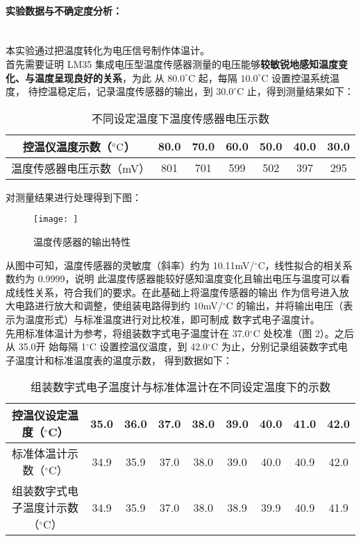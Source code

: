 \documentclass[UTF8]{ctexart}
\begin{document}
\title{}
\author{\songti{\large{}}}
\maketitle
{}
\paragraph*{实验数据与不确定度分析：}~\\
\indent 本实验通过把温度转化为电压信号制作体温计。~\\
\indent 首先需要证明 LM35 集成电压型温度传感器测量的电压能够\textbf{较敏锐地感知温度变化、与温度呈现良好的关系}，为此
从 $80.0^\circ$C 起，每隔 $10.0^\circ$C 设置控温系统温度，
待控温稳定后，记录温度传感器的输出，到 $30.0^\circ$C 止，得到测量结果如下：
\begin{table}[H]
    \centering
    \caption{不同设定温度下温度传感器电压示数}
    \begin{tabular}{ccccccc}
        \hline
     控温仪温度示数（$^{\circ}\rm{C}$）& 80.0  & 70.0  & 60.0   & 50.0  & 40.0 &30.0\\
    \hline
    温度传感器电压示数（mV） &801 &701 &599 &502 &397 &295\\
    \hline                  
    \end{tabular}
    \end{table}
对测量结果进行处理得到下图：
\begin{figure}[H]
    \centering
    \texttt{[image: ]}
    \caption{温度传感器的输出特性}
 \end{figure}
 从图中可知，温度传感器的灵敏度（斜率）约为 10.11mV/$^\circ$C，线性拟合的相关系数约为 0.9999，说明
 此温度传感器能较好感知温度变化且输出电压与温度可以看成线性关系，符合我们的要求。在此基础上将温度传感器的输出
 作为信号进入放大电路进行放大和调整，使组装电路得到约 10mV/$^\circ$C 的输出，并将输出电压（表示为温度形式）与标准温度进行对比校准，即可制成
 数字式电子温度计。~\\
 \indent 先用标准体温计为参考，将组装数字式电子温度计在 37.0$^\circ$C 处校准（图 2）。之后从 35.0开
 始每隔 1$^\circ$C 设置控温仪温度，到 42.0$^\circ$C 为止，分别记录组装数字式电子温度计和标准温度表的温度示数，
 得到数据如下：
 \begin{table}[H]
    \centering
    \caption{组装数字式电子温度计与标准体温计在不同设定温度下的示数}
    \begin{tabular}{ccccccccc}
        \hline
     控温仪设定温度（$^{\circ}$C）& 35.0  & 36.0  & 37.0   & 38.0  & 39.0 &40.0 &41.0 &42.0\\
    \hline
    标准体温计示数（$^{\circ}$C）& 34.9  & 35.9  & 37.0   & 38.0  & 39.0 &40.0 &40.9 &42.0\\
    组装数字式电子温度计示数（$^{\circ}$C）& 34.9  & 35.9  & 37.0   & 38.0  & 38.9 &39.9 &40.9 &41.9\\
    \hline                  
    \end{tabular}
    \end{table}
\end{document}

